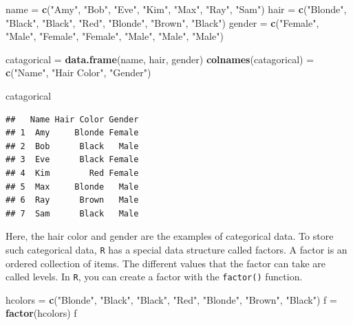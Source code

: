 \documentclass[
]{book}
\newenvironment{Shaded}{\begin{snugshade}}{\end{snugshade}}
\newcommand{\KeywordTok}[1]{\textcolor[rgb]{0.13,0.29,0.53}{\textbf{#1}}}
\newcommand{\NormalTok}[1]{#1}
\newcommand{\StringTok}[1]{\textcolor[rgb]{0.31,0.60,0.02}{#1}}
\begin{document}
\begin{Shaded}
\begin{Highlighting}[]
\NormalTok{name =}\StringTok{ }\KeywordTok{c}\NormalTok{(}\StringTok{"Amy"}\NormalTok{, }\StringTok{"Bob"}\NormalTok{, }\StringTok{"Eve"}\NormalTok{, }\StringTok{"Kim"}\NormalTok{, }\StringTok{"Max"}\NormalTok{, }\StringTok{"Ray"}\NormalTok{, }\StringTok{"Sam"}\NormalTok{)}
\NormalTok{hair =}\StringTok{ }\KeywordTok{c}\NormalTok{(}\StringTok{"Blonde"}\NormalTok{, }\StringTok{"Black"}\NormalTok{, }\StringTok{"Black"}\NormalTok{, }\StringTok{"Red"}\NormalTok{, }\StringTok{"Blonde"}\NormalTok{, }\StringTok{"Brown"}\NormalTok{, }\StringTok{"Black"}\NormalTok{)}
\NormalTok{gender =}\StringTok{ }\KeywordTok{c}\NormalTok{(}\StringTok{"Female"}\NormalTok{, }\StringTok{"Male"}\NormalTok{, }\StringTok{"Female"}\NormalTok{, }\StringTok{"Female"}\NormalTok{, }\StringTok{"Male"}\NormalTok{, }\StringTok{"Male"}\NormalTok{, }\StringTok{"Male"}\NormalTok{)}

\NormalTok{catagorical =}\StringTok{ }\KeywordTok{data.frame}\NormalTok{(name, hair, gender)}
\KeywordTok{colnames}\NormalTok{(catagorical) =}\StringTok{ }\KeywordTok{c}\NormalTok{(}\StringTok{"Name"}\NormalTok{, }\StringTok{"Hair Color"}\NormalTok{, }\StringTok{"Gender"}\NormalTok{)}

\NormalTok{catagorical}
\end{Highlighting}
\end{Shaded}

\begin{verbatim}
##   Name Hair Color Gender
## 1  Amy     Blonde Female
## 2  Bob      Black   Male
## 3  Eve      Black Female
## 4  Kim        Red Female
## 5  Max     Blonde   Male
## 6  Ray      Brown   Male
## 7  Sam      Black   Male
\end{verbatim}

Here, the hair color and gender are the examples of categorical data. To store such categorical data, \texttt{R} has a special data structure called factors. A factor is an ordered collection of items. The different values that the factor can take are called levels. In \texttt{R}, you can create a factor with the \texttt{factor()} function.

\begin{Shaded}
\begin{Highlighting}[]
\NormalTok{hcolors =}\StringTok{ }\KeywordTok{c}\NormalTok{(}\StringTok{"Blonde"}\NormalTok{, }\StringTok{"Black"}\NormalTok{, }\StringTok{"Black"}\NormalTok{, }\StringTok{"Red"}\NormalTok{, }\StringTok{"Blonde"}\NormalTok{, }\StringTok{"Brown"}\NormalTok{, }\StringTok{"Black"}\NormalTok{)}
\NormalTok{f =}\StringTok{ }\KeywordTok{factor}\NormalTok{(hcolors)}
\NormalTok{f}
\end{Highlighting}
\end{Shaded}
\end{document}
